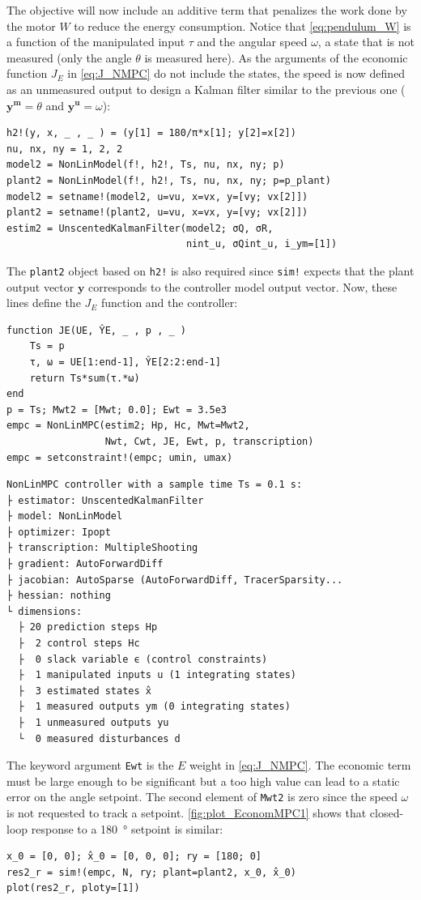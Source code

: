 The objective will now include an additive term that penalizes the work done by the motor $W$ to reduce the energy consumption. Notice that \eqref{eq:pendulum_W} is a function of the manipulated input $\tau$ and the angular speed $\omega$, a state that is not measured (only the angle $\theta$ is measured here). As the arguments of the economic function $J_E$ in \eqref{eq:J_NMPC} do not include the states, the speed is now defined as an unmeasured output to design a Kalman filter similar to the previous one ($\mathbf{y^m} = \theta$ and $\mathbf{y^u} = \omega$): 

\begin{verbatim}
h2!(y, x, _ , _ ) = (y[1] = 180/π*x[1]; y[2]=x[2])
nu, nx, ny = 1, 2, 2
model2 = NonLinModel(f!, h2!, Ts, nu, nx, ny; p)
plant2 = NonLinModel(f!, h2!, Ts, nu, nx, ny; p=p_plant)
model2 = setname!(model2, u=vu, x=vx, y=[vy; vx[2]])
plant2 = setname!(plant2, u=vu, x=vx, y=[vy; vx[2]])
estim2 = UnscentedKalmanFilter(model2; σQ, σR, 
                               nint_u, σQint_u, i_ym=[1])
\end{verbatim}
The \texttt{plant2} object based on \texttt{h2!} is also required since \texttt{sim!} expects that the plant output vector $\mathbf{y}$ corresponds to the controller model output vector. Now, these lines define the $J_E$ function and the controller:
\begin{verbatim}
function JE(UE, ŶE, _ , p , _ )
    Ts = p
    τ, ω = UE[1:end-1], ŶE[2:2:end-1]
    return Ts*sum(τ.*ω)
end
p = Ts; Mwt2 = [Mwt; 0.0]; Ewt = 3.5e3
empc = NonLinMPC(estim2; Hp, Hc, Mwt=Mwt2, 
                 Nwt, Cwt, JE, Ewt, p, transcription)
empc = setconstraint!(empc; umin, umax)
\end{verbatim}
\spacerepl
\begin{verbatim}
NonLinMPC controller with a sample time Ts = 0.1 s:
├ estimator: UnscentedKalmanFilter
├ model: NonLinModel
├ optimizer: Ipopt 
├ transcription: MultipleShooting
├ gradient: AutoForwardDiff
├ jacobian: AutoSparse (AutoForwardDiff, TracerSparsity...
├ hessian: nothing
└ dimensions:
  ├ 20 prediction steps Hp
  ├  2 control steps Hc
  ├  0 slack variable ϵ (control constraints)
  ├  1 manipulated inputs u (1 integrating states)
  ├  3 estimated states x̂
  ├  1 measured outputs ym (0 integrating states)
  ├  1 unmeasured outputs yu
  └  0 measured disturbances d
\end{verbatim}

The keyword argument \texttt{Ewt} is the $E$ weight in \eqref{eq:J_NMPC}. The economic term must be large enough to be significant but a too high value can lead to a static error on the angle setpoint. The second element of \texttt{Mwt2} is zero since the speed $\omega$ is not requested to track a setpoint. \cref{fig:plot_EconomMPC1} shows that closed-loop response to a \SI{180}{\degree} setpoint is similar:
\begin{verbatim}
x_0 = [0, 0]; x̂_0 = [0, 0, 0]; ry = [180; 0]
res2_r = sim!(empc, N, ry; plant=plant2, x_0, x̂_0)
plot(res2_r, ploty=[1])
\end{verbatim}

